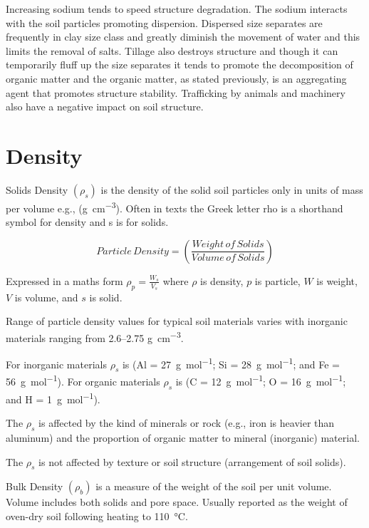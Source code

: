 \documentclass[letterpaper, 12pt]{article}
\begin{document}
Increasing sodium tends to speed structure degradation. The sodium interacts with the soil particles promoting dispersion. Dispersed size separates are frequently in clay size class and greatly diminish the movement of water and this limits the removal of salts. Tillage also destroys structure and though it can temporarily fluff up the size separates it tends to promote the decomposition of organic matter and the organic matter, as stated previously, is an aggregating agent that promotes structure stability. Trafficking by animals and machinery also have a negative impact on soil structure.
    
\section{Density}
\label{density}
    
Solids Density $\left(\rho_s\right)$ is the density of the solid soil particles only in units of mass per volume e.g., (\unit{\gram\per\cubic\centi\metre}). Often in texts the Greek letter rho  is a shorthand symbol for density and s is for solids.

\begin{equation}
    Particle\,Density = \left(\frac{Weight\,of\,Solids}{Volume\,of\,Solids}\right)   
\end{equation}

Expressed in a maths form $\rho_p =\frac{W_s}{V_s}$ where $\rho$ is density, $p$ is particle, $W$ is weight, $V$ is volume, and $s$ is solid.

Range of particle density values for typical soil materials varies with inorganic materials ranging from \numrange{2.6}{2.75} \unit{\gram\per\cubic\centi\metre}.

For inorganic materials $\rho_s$ is  (Al = \qty[per-mode=symbol]{27}{\gram\per\mole}; Si =  \qty[per-mode=symbol]{28}{\gram\per\mole}; and Fe = \qty[per-mode=symbol]{56}{\gram\per\mole}). For organic materials $\rho_s$ is  (C = \qty[per-mode=symbol]{12}{\gram\per\mole}; O = \qty[per-mode=symbol]{16}{\gram\per\mole}; and H = \qty[per-mode=symbol]{1}{\gram\per\mole}).

The $\rho_s$ is affected by the kind of minerals or rock (e.g., iron is heavier than aluminum) and the proportion of organic matter to mineral (inorganic) material.

The $\rho_s$ is not affected by texture or soil structure (arrangement of soil solids).

Bulk Density $\left(\rho_b\right)$ is a measure of the weight of the soil per unit volume. Volume includes both solids and pore space. Usually reported as the weight of oven-dry soil following heating to \qty{110}{\degreeCelsius}.
\end{document}
